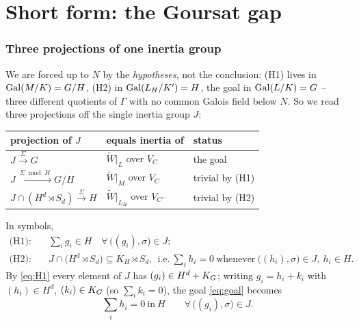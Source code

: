 \documentclass[11pt]{article}
\begin{document}
\part{Short form: the Goursat gap}\label{part:short}

\section{Three projections of one inertia group}\label{sec:attempt}

We are forced up to $N$ by the \emph{hypotheses}, not the conclusion: (H1)
lives in $\operatorname{Gal}(M/K)=G/H$, (H2) in $\operatorname{Gal}(L_H/K')=H$, the goal in
$\operatorname{Gal}(L/K)=G$ -- three different quotients of $\Gamma$ with no common Galois
field below $N$. So we read three projections off the single inertia group $J$:
\begin{center}
\begin{tabular}{lll}
\toprule
projection of $J$ & equals inertia of & status\\
\midrule
$J\xrightarrow{\ \Sigma\ }G$ & $\widetilde W|_L$ over $V_C$ & the goal\\
$J\xrightarrow{\ \Sigma\bmod H\ }G/H$ & $\widetilde W|_M$ over $V_C$ & trivial by (H1)\\
$J\cap(H^d\rtimes S_d)\xrightarrow{\ \Sigma\ }H$ & $\widetilde W|_{L_H}$ over $V_{C'}$ & trivial by (H2)\\
\bottomrule
\end{tabular}
\end{center}
In symbols,
\begin{align}
\text{(H1)}:&\quad \textstyle\sum_i g_i \in H\quad\forall\,\big((g_i),\sigma\big)\in J ;
\label{eq:H1}\\
\text{(H2)}:&\quad J\cap\big(H^d\rtimes S_d\big)\subseteq K_H\rtimes S_d,\ \ \text{i.e.}\
\textstyle\sum_i h_i=0\ \text{whenever}\ \big((h_i),\sigma\big)\in J,\ h_i\in H.
\label{eq:H2}
\end{align}
By \cref{eq:H1} every element of $J$ has $(g_i)\in H^d+K_{G}$; writing
$g_i=h_i+k_i$ with $(h_i)\in H^d$, $(k_i)\in K_{G}$ (so $\sum_i k_i=0$), the goal
\cref{eq:goal} becomes
\begin{equation}\label{eq:goal2}
\textstyle\sum_i h_i = 0\ \text{in}\ H\qquad\forall\,\big((g_i),\sigma\big)\in J .
\end{equation}
\end{document}
